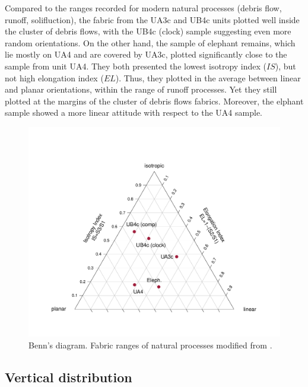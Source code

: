 \documentclass[preprint,authoryear,times]{elsarticle} %
\begin{document}
Compared to the ranges recorded for modern natural processes (debris flow, runoff, solifluction), the fabric from the UA3c and UB4c units plotted well inside the cluster of debris flows, with the UB4c (clock) sample suggesting even more random orientations. On the other hand, the sample of elephant remains, which lie mostly on UA4 and are covered by UA3c, plotted significantly close to the sample from unit UA4. They both presented the lowest isotropy index ($IS$), but not high elongation index ($EL$). Thus, they plotted in the average between linear and planar orientations, within the range of runoff processes. Yet they still plotted at the margins of the cluster of debris flows fabrics. Moreover, the elphant sample showed a more linear attitude with respect to the UA4 sample.

\begin{figure}[]
  \centering
  \includegraphics[width=1\textwidth]{../artwork/Fig8.pdf}
  \caption{Benn's diagram. Fabric ranges of natural processes modified from \cite{Bertran1997,Lenoble2004}.}
  \label{fig:8}
\end{figure}

\subsection{Vertical distribution}


\end{document}
